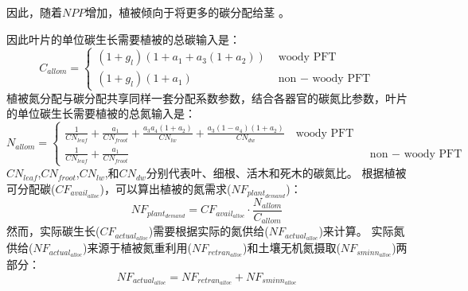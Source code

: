 因此，随着$NPP$增加，植被倾向于将更多的碳分配给茎 \citep{allen2005,vanninen2005carbon}。


因此叶片的单位碳生长需要植被的总碳输入是：
\begin{equation}\label{C_allom}
C_{ {allom }}=\left\{\begin{array}{lr}\left(1+g_{l}\right)\left(1+a_{1}+a_{3}\left(1+a_{2}\right)\right) &  \text{ woody } \text{PFT} \\ 
  \left(1+g_{l}\right)\left(1+a_{1}\right) &  \text{ non }- \text{ woody } \text{PFT}\end{array}\right.
\end{equation}
植被氮分配与碳分配共享同样一套分配系数参数，结合各器官的碳氮比参数，叶片的单位碳生长需要植被的总氮输入是：
\begin{equation}\label{N_allom}
N_{ {allom }}=\left\{\begin{array}{lr}\frac{1}{CN_{ {leaf }}}+\frac{a_{1}}{CN_{ {froot }}}+\frac{a_{3} a_{4}\left(1+a_{2}\right)}
  {CN_{l w}}+\frac{a_{3}\left(1-a_{4}\right)\left(1+a_{2}\right)}{CN_{d w}} \ \ \  \text { woody PFT } \\ 
  \frac{1}{CN_{ {leaf }}}+\frac{a_{1}}{CN_{ {froot }}} & \text { non }- \text{ woody PFT }\end{array}\right.
\end{equation}
$CN_{leaf}$,$CN_{froot}$,$CN_{lw}$,和$CN_{dw}$分别代表叶、细根、活木和死木的碳氮比。
根据植被可分配碳($CF_{avail_{alloc}}$)，可以算出植被的氮需求($NF_{plant_{demand}}$)：
\begin{equation}
N F_{ {plant_{demand }}}=CF_{ {avail_{alloc }}} \cdot \frac{N_{ {allom }}}{C_{ {allom }}}
\end{equation}
然而，实际碳生长($CF_{actual_{alloc}}$)需要根据实际的氮供给($NF_{actual_{alloc}}$)来计算。
实际氮供给($NF_{actual_{alloc}}$)来源于植被氮重利用($NF_{retran_{alloc}}$)和土壤无机氮摄取($NF_{sminn_{alloc}}$)两部分：
\begin{equation}\label{NF_actual_alloc}
NF_{actual_{alloc}}=NF_{retran_{alloc}}+NF_{sminn_{alloc}}
\end{equation}



